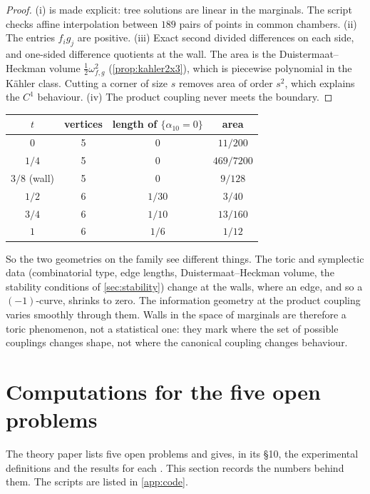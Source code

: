 \documentclass[11pt]{article}
\theoremstyle{definition}
\theoremstyle{remark}
\begin{document}
\begin{proof}
(i) is \cite[Prop.~6.6]{Conditionals} made explicit: tree solutions are linear in the marginals. The script checks affine
interpolation between $189$ pairs of points in common chambers. (ii) The entries $f_ig_j$ are positive. (iii) Exact
second divided differences on each side, and one-sided difference quotients at the wall. The area is the
Duistermaat--Heckman volume $\tfrac12\omega_{f,g}^2$ (\cref{prop:kahler2x3}), which is piecewise polynomial in the
Kähler class. Cutting a corner of size $s$ removes area of order $s^2$, which explains the $C^1$ behaviour.
(iv) The product coupling never meets the boundary.
\end{proof}

\begin{center}\small
\begin{tabular}{@{}cccc@{}}
\toprule
$t$ & vertices & length of $\{\alpha_{10}=0\}$ & area\\
\midrule
$0$ & 5 & 0 & $11/200$\\
$1/4$ & 5 & 0 & $469/7200$\\
$3/8$ (wall) & 5 & 0 & $9/128$\\
$1/2$ & 6 & $1/30$ & $3/40$\\
$3/4$ & 6 & $1/10$ & $13/160$\\
$1$ & 6 & $1/6$ & $1/12$\\
\bottomrule
\end{tabular}
\end{center}

So the two geometries on the family see different things. The toric and symplectic data (combinatorial type,
edge lengths, Duistermaat--Heckman volume, the stability conditions of \cref{sec:stability}) change at the walls,
where an edge, and so a $(-1)$-curve, shrinks to zero. The information geometry at the product coupling varies
smoothly through them. Walls in the space of marginals are therefore a toric phenomenon, not a statistical one:
they mark where the set of possible couplings changes shape, not where the canonical coupling changes behaviour.

\section{Computations for the five open problems}\label{sec:open}

The theory paper lists five open problems and gives, in its \S10, the experimental definitions and the
results for each \cite[\S10]{Conditionals}. This section records the numbers behind them. The scripts are listed in
\cref{app:code}.
\end{document}
